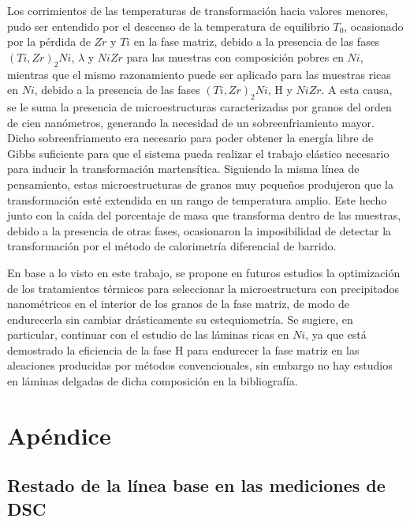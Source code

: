 \documentclass[12pt]{article}
\theoremstyle{definition}
\theoremstyle{remark}
\begin{document}
Los corrimientos de las temperaturas de transformación hacia valores menores, pudo ser entendido por el descenso de la temperatura de equilibrio $T_0$, ocasionado por la pérdida de $Zr$ y $Ti$ en la fase matriz, debido a la presencia de las fases $(Ti,Zr)_2 Ni$, $\lambda$ y $NiZr$ para las muestras con composición pobres en $Ni$, mientras que el mismo razonamiento puede ser aplicado para las muestras ricas en $Ni$, debido a la presencia de las fases $(Ti,Zr)_2 Ni$, H y $NiZr$. A esta causa, se le suma la presencia de microestructuras caracterizadas por granos del orden de cien nanómetros, generando la necesidad de un sobreenfriamiento mayor. Dicho sobreenfriamento era necesario para poder obtener la energía libre de Gibbs suficiente para que el sistema pueda realizar el trabajo elástico necesario para inducir la transformación martensítica. Siguiendo la misma línea de pensamiento, estas microestructuras de granos muy pequeños produjeron que la transformación esté extendida en un rango de temperatura amplio. Este hecho junto con la caída del porcentaje de masa que transforma dentro de las muestras, debido a la presencia de otras fases, ocasionaron la imposibilidad de detectar la transformación por el método de calorimetría diferencial de barrido.

En base a lo visto en este trabajo, se propone en futuros estudios la optimización de los tratamientos térmicos para seleccionar la microestructura con precipitados nanométricos en el interior de los granos de la fase matriz, de modo de endurecerla sin cambiar drásticamente su estequiometría. Se sugiere, en particular, continuar con el estudio de las láminas ricas en $Ni$, ya que está demostrado la eficiencia de la fase H para endurecer la fase matriz en las aleaciones producidas por métodos convencionales, sin embargo no hay estudios en láminas delgadas de dicha composición en la bibliografía.


\newpage
\nocite{*} 


\newpage
\appendix
\section{Apéndice}
\label{Appendix}
\subsection{Restado de la línea base en las mediciones de DSC}
\label{BaseLineAppendix}
\end{document}
